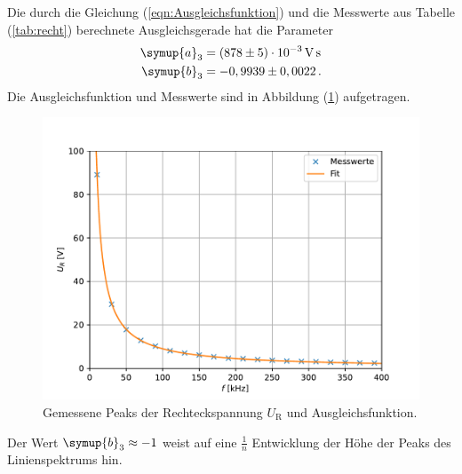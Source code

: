 Die durch die Gleichung (\ref{eqn:Ausgleichsfunktion}) und die Messwerte aus Tabelle (\ref{tab:recht}) berechnete Ausgleichsgerade hat die Parameter
\begin{align*}
  \symup{a}_3 &= (878 \pm 5) \cdot 10^{-3} \, \unit{\volt\second} \\
  \symup{b}_3 &= -0,9939 \pm 0,0022 \, .
\end{align*}
Die Ausgleichsfunktion und Messwerte sind in Abbildung (\ref{fig:recht}) aufgetragen. 
\begin{figure}[H]
  \centering
  \includegraphics[width = 0.7\linewidth]{plot2.pdf}
  \caption{Gemessene Peaks der Rechteckspannung $U_{\text{R}}$ und Ausgleichsfunktion.}
  \label{fig:recht}
\end{figure}
Der Wert $\symup{b}_3 \approx -1$ weist auf eine $\frac{1}{n}$ Entwicklung der Höhe der Peaks des Linienspektrums hin. 




